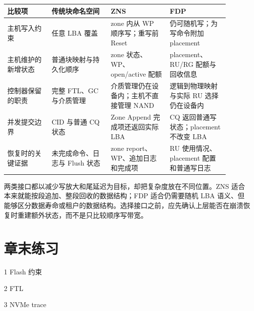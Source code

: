
\begin{longtable}{L{0.18\linewidth}L{0.24\linewidth}L{0.24\linewidth}L{0.24\linewidth}}
\toprule
比较项 & 传统块命名空间 & ZNS & FDP \\
\midrule
主机写入约束 & 任意 LBA 覆盖 & zone 内从 WP 顺序写；重写前 Reset & 仍可随机写；为写命令附加 placement \\\tablerowrule
主机维护的新增状态 & 普通块映射与持久化顺序 & zone 状态、WP、open/active 配额 & placement、RU/RG 配额与回收信息 \\\tablerowrule
控制器保留的职责 & 完整 FTL、GC 与介质管理 & 介质管理仍在设备内；主机不直接管理 NAND & 逻辑到物理映射与实际 RU 选择仍在设备内 \\\tablerowrule
并发提交边界 & CID 与普通 CQ 状态 & Zone Append 完成项还返回实际 LBA & CQ 返回普通写状态；placement 不改变 LBA \\\tablerowrule
恢复时的关键证据 & 未完成命令、日志与 Flush 状态 & zone report、WP、追加日志和完成项 & RU 使用情况、placement 配置和普通写日志 \\
\bottomrule
\end{longtable}

两类接口都以减少写放大和尾延迟为目标，却把复杂度放在不同位置。ZNS 适合本来就能按段追加、整段回收的数据结构；FDP 适合仍需要随机 LBA 语义、但能够区分数据寿命或租户的数据结构。选择接口之前，应先确认上层能否在崩溃恢复时重建额外状态，而不是只比较顺序写带宽。

\section*{章末练习}

\begin{chapterexercise}{1}
Flash 约束
\end{chapterexercise}

\begin{chapterexercise}{2}
FTL
\end{chapterexercise}

\begin{chapterexercise}{3}
NVMe trace
\end{chapterexercise}

